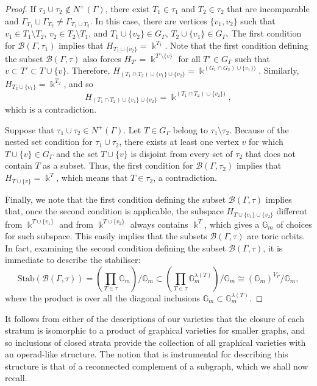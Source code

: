 \documentclass[11pt]{article}
\theoremstyle{definition}
\numberwithin{equation}{section}
\newcommand\calB{\mathcal{B}}
\newcommand\kk{\Bbbk}
\begin{document}
\begin{proof}
If $\tau_1\cup \tau_2\notin N^+(\Gamma)$, there exist $T_1\in\tau_1$ and $T_2\in\tau_2$ that are incomparable and $\Gamma_{T_1}\sqcup \Gamma_{T_2}\neq\Gamma_{T_1\cup T_2}$. In this case, there are vertices $\{v_1,v_2\}$ such that $v_1\in T_1\setminus T_2$, $v_2\in T_2\setminus T_1$, and $T_1\cup\{v_2\}\in G_\Gamma$, $T_2\cup \{v_1\}\in G_\Gamma$. The first condition for $\calB(\Gamma,\tau_1)$ implies that $H_{T_1\cup\{v_2\}}=\kk^{T_1}$. Note that the first condition defining the subset $\calB(\Gamma,\tau)$ also forces $H_{T'}=\kk^{T'\setminus\{v\}}$ for all $T'\in G_\Gamma$ such that $v\subset T'\subset T\cup\{v\}$. Therefore, $H_{(T_1\cap T_2)\cup\{v_1\}\cup\{v_2\}}=\kk^{(G_1\cap G_2)\cup \{v_1\})}$. Similarly, $H_{T_2\cup\{v_1\}}= \kk^{T_2}$, and so 
 \[
H_{(T_1\cap T_2)\cup\{v_1\} \cup  \{v_2\}}=\kk^{(T_1\cap T_2)\cup\{v_2\})},
 \] 
which is a contradiction.

Suppose that $\tau_1\cup\tau_2\in N^+(\Gamma)$. Let $T\in G_\Gamma$ belong to $\tau_1\setminus\tau_2$. Because of the nested set condition for $\tau_1\cup\tau_2$, there exists at least one vertex $v$ for which $T\cup\{v\}\in G_\Gamma$ and the set $T\cup\{v\}$ is disjoint from every set of $\tau_2$ that does not contain $T$ as a subset. Thus, the first condition for $\calB(\Gamma,\tau_2)$ implies that $H_{T\cup\{v\}}=\kk^{T}$, which means that $T\in \tau_2$, a contradiction.  

Finally, we note that the first condition defining the subset $\calB(\Gamma,\tau)$ implies that, once the second condition is applicable, the subspace $H_{T\cup\{v_1\}\cup\{v_2\}}$ different from $\kk^{T\cup\{v_1\}}$ and from $\kk^{T\cup\{v_2\}}$ always contains $\kk^{T}$, which gives a $\mathbb{G}_m$ of choices for such subspace. This easily implies that the subsets $\calB(\Gamma,\tau)$ are toric orbits. In fact, examining the second condition defining the subset $\calB(\Gamma,\tau)$, it is immediate to describe the stabiliser:
 \[
\mathrm{Stab}(\calB(\Gamma,\tau))=\left(\prod_{T\in\tau} \mathbb{G}_m\right)/\mathbb{G}_m\subset
\left(\prod_{T\in\tau} \mathbb{G}_m^{\lambda(T)}\right)/\mathbb{G}_m\cong(\mathbb{G}_m)^{V_\Gamma}/\mathbb{G}_m,
 \]
where the product is over all the diagonal inclusions $\mathbb{G}_m\subset\mathbb{G}_m^{\lambda(T)}$.
\end{proof}

It follows from either of the descriptions of our varieties that the closure of each stratum is isomorphic to a product of graphical varieties for smaller graphs, and so inclusions of closed strata provide the collection of all graphical varieties with an operad-like structure. The notion that is instrumental for describing this structure is that of a reconnected complement of a subgraph, which we shall now recall.
\end{document}
